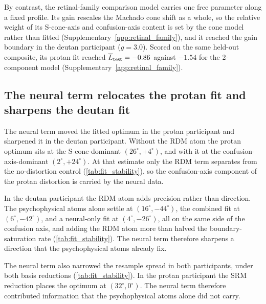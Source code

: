 By contrast, the retinal-family comparison model carries one free parameter along a fixed profile. Its gain rescales the Machado cone shift as a whole, so the relative weight of its S-cone-axis and confusion-axis content is set by the cone model rather than fitted (Supplementary~\cref{app:retinal_family}), and it reached the gain boundary in the deutan participant ($g = 3.0$). Scored on the same held-out composite, its protan fit reached $\overline{L}_{\rm test} = -0.86$ against $-1.54$ for the 2-component model (Supplementary~\cref{app:retinal_family}).


\subsection{The neural term relocates the protan fit and sharpens the deutan fit}
\label{sec:results:neural_role}

The neural term moved the fitted optimum in the protan participant and sharpened it in the deutan participant. Without the RDM atom the protan optimum sits at the S-cone-dominant $(26^\circ, +4^\circ)$, and with it at the confusion-axis-dominant $(2^\circ, +24^\circ)$. At that estimate only the RDM term separates from the no-distortion control (\cref{tab:fit_stability}), so the confusion-axis component of the protan distortion is carried by the neural data.

In the deutan participant the RDM atom adds precision rather than direction. The psychophysical atoms alone settle at $(16^\circ, -44^\circ)$, the combined fit at $(6^\circ, -42^\circ)$, and a neural-only fit at $(4^\circ, -26^\circ)$, all on the same side of the confusion axis, and adding the RDM atom more than halved the boundary-saturation rate (\cref{tab:fit_stability}). The neural term therefore sharpens a direction that the psychophysical atoms already fix.

The neural term also narrowed the resample spread in both participants, under both basis reductions (\cref{tab:fit_stability}). In the protan participant the SRM reduction places the optimum at $(32^\circ, 0^\circ)$. The neural term therefore contributed information that the psychophysical atoms alone did not carry.

